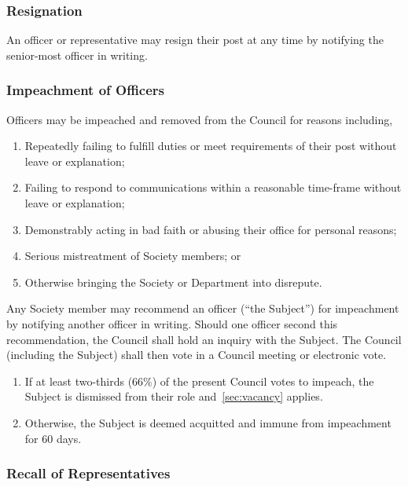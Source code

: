 \subsubsection{Resignation}

An officer or representative may resign their post at any time by notifying the
senior-most officer in writing.

\subsubsection{Impeachment of Officers}\label{sec:impeachment}

Officers may be impeached and removed from the Council for reasons including,

\begin{enumerate}
      \item Repeatedly failing to fulfill duties or meet requirements of their post without
            leave or explanation;
      \item Failing to respond to communications within a reasonable time-frame without
            leave or explanation;
      \item Demonstrably acting in bad faith or abusing their office for personal reasons;
      \item Serious mistreatment of Society members; or
      \item Otherwise bringing the Society or Department into disrepute.
\end{enumerate}

Any Society member may recommend an officer (``the Subject'') for impeachment
by notifying another officer in writing. Should one officer second this
recommendation, the Council shall hold an inquiry with the Subject. The Council
(including the Subject) shall then vote in a Council meeting or electronic
vote.

\begin{enumerate}
      \item If at least two-thirds ($66\%$) of the present Council votes to impeach, the
            Subject is dismissed from their role and~\ref{sec:vacancy} applies.
      \item Otherwise, the Subject is deemed acquitted and immune from impeachment for 60
            days.
\end{enumerate}

\subsubsection{Recall of Representatives}\label{sec:recall}

